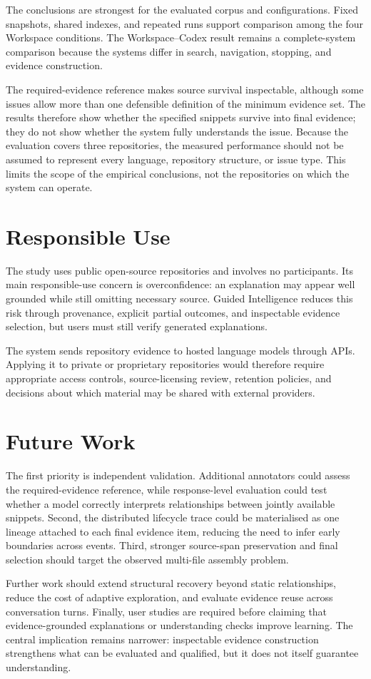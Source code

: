 The conclusions are strongest for the evaluated corpus and configurations. Fixed snapshots, shared indexes, and repeated runs support comparison among the four Workspace conditions. The Workspace--Codex result remains a complete-system comparison because the systems differ in search, navigation, stopping, and evidence construction.

The required-evidence reference makes source survival inspectable, although some issues allow more than one defensible definition of the minimum evidence set. The results therefore show whether the specified snippets survive into final evidence; they do not show whether the system fully understands the issue. Because the evaluation covers three repositories, the measured performance should not be assumed to represent every language, repository structure, or issue type. This limits the scope of the empirical conclusions, not the repositories on which the system can operate.

\section{Responsible Use}\label{sec:responsible-use}

The study uses public open-source repositories and involves no participants. Its main responsible-use concern is overconfidence: an explanation may appear well grounded while still omitting necessary source. Guided Intelligence reduces this risk through provenance, explicit partial outcomes, and inspectable evidence selection, but users must still verify generated explanations.

The system sends repository evidence to hosted language models through APIs. Applying it to private or proprietary repositories would therefore require appropriate access controls, source-licensing review, retention policies, and decisions about which material may be shared with external providers.

\section{Future Work}\label{sec:future-work}

The first priority is independent validation. Additional annotators could assess the required-evidence reference, while response-level evaluation could test whether a model correctly interprets relationships between jointly available snippets. Second, the distributed lifecycle trace could be materialised as one lineage attached to each final evidence item, reducing the need to infer early boundaries across events. Third, stronger source-span preservation and final selection should target the observed multi-file assembly problem.

Further work should extend structural recovery beyond static relationships, reduce the cost of adaptive exploration, and evaluate evidence reuse across conversation turns. Finally, user studies are required before claiming that evidence-grounded explanations or understanding checks improve learning. The central implication remains narrower: inspectable evidence construction strengthens what can be evaluated and qualified, but it does not itself guarantee understanding.
